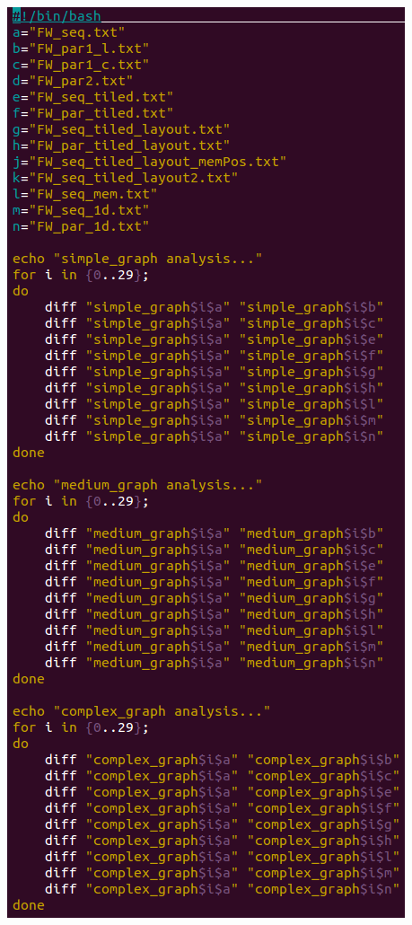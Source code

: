 \documentclass[a4paper,11pt]{article}
\begin{document}
\begin{minipage}{0.65\linewidth}
  \begin{center}
    \includegraphics[scale=0.55]{diff_script.png}
  \end{center}
\end{minipage}
\end{document}
